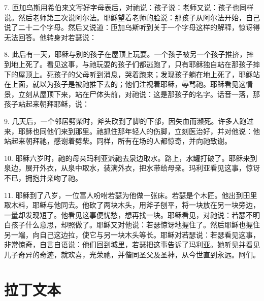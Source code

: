 7. 匝加乌斯用希伯来文写好字母表后，对祂说：孩子说：老师又说：孩子也同样说。然后老师第三次说阿尔法。耶稣望着老师的脸说：那孩子从阿尔法开始，自己说了二十二个字母。然后又说道：匝加乌斯听到关于一个字母这样的解释，惊讶得无法回答。他转身对若瑟说：\par

8. 此后有一天，耶稣与别的孩子在屋顶上玩耍。一个孩子被另一个孩子推挤，摔到地上死了。看见这事，与祂玩耍的孩子们都逃跑了，只有耶稣独自站在那孩子摔下的屋顶上。死孩子的父母听到消息，哭着跑来；发现孩子躺在地上死了，耶稣站在上面，就以为孩子是被祂推下去的；他们注视着耶稣，辱骂祂。耶稣看见这情景，立刻从屋顶下来，站在尸体头前，对祂说：这是那孩子的名字。话音一落，那孩子站起来朝拜耶稣，说：\par

9. 几天后，一个邻居劈柴时，斧头砍到了脚的下部，因失血而濒死。许多人跑过来，耶稣也同他们来到那里。祂抓住那年轻人的伤脚，立刻医治好，并对他说：他站起来朝拜祂，感谢着劈柴。同样，所有在场的人都惊奇，并向祂致谢。\par

10. 耶稣六岁时，祂的母亲玛利亚派祂去泉边取水。路上，水罐打破了。耶稣来到泉边，展开外衣，从泉中取水，装满外衣，把水带给母亲。玛利亚看见这事，惊讶不已，拥抱并亲吻了祂。\par

11. 耶稣到了八岁，一位富人吩咐若瑟为他做一张床。若瑟是个木匠。他出到田里取木料，耶稣与他同去。他砍了两块木头，用斧子刨平，将一块放在另一块旁边，一量却发现短了。他看见这事便忧愁，想再找一块。耶稣看见，对祂说：若瑟不明白孩子什么意思，却照做了。耶稣又对他说：若瑟惊讶地握住了。然后耶稣也握住另一端，向自己这边拉，使它与另一块木头等长。耶稣对若瑟说：若瑟看见这事，非常惊奇，自言自语说：他们回到城里，若瑟把这事告诉了玛利亚。她听见并看见儿子奇异的奇迹，就欢喜，光荣祂，并偕同圣父及圣神，从今世直到永远。阿们。\par


\section{拉丁文本}

